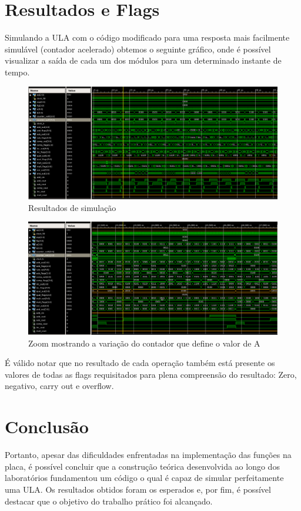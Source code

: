 \documentclass[a4paper, 12pt]{article}
\begin{document}
\section{Resultados e Flags}

Simulando a ULA com o código modificado para uma resposta mais facilmente simulável (contador acelerado) obtemos o seguinte gráfico, onde é possível visualizar a saída de cada um dos módulos para um determinado instante de tempo.
\begin{figure}[H]
    \centering
    \includegraphics[width=13cm]{imagens/simu_sem_zoom.png}
    \caption{Resultados de simulação}
    \label{fig:simu}
\end{figure}
\begin{figure}[H]
    \centering
    \includegraphics[width=13cm]{imagens/simu_com_zoom.png}
    \caption{Zoom mostrando a variação do contador que define o valor de A}
    \label{fig:simu_zoom}
\end{figure}

É válido notar que no resultado de cada operação também está presente os valores de todas as flags requisitados para plena compreensão do resultado: Zero, negativo, carry out e overflow.

\section{Conclusão}

Portanto, apesar das dificuldades enfrentadas na implementação das funções na placa, é possível concluir que a construção teórica desenvolvida ao longo dos laboratórios fundamentou um código o qual é capaz de simular perfeitamente uma ULA. Os resultados obtidos foram os esperados e, por fim, é possível destacar que o objetivo do trabalho prático foi alcançado.
\end{document}
